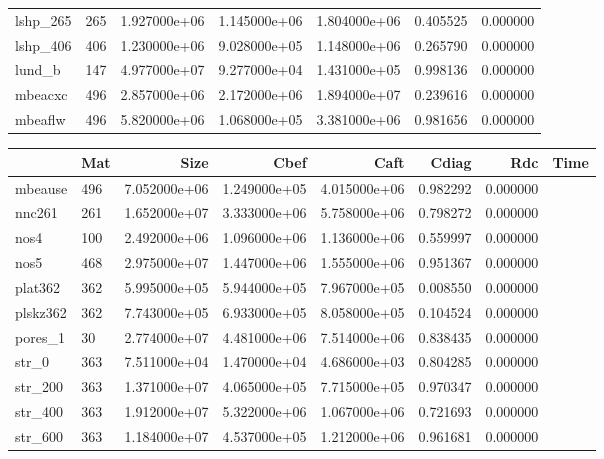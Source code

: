 \begin{tabular}{lrrrrrr}
lshp\_265                &  265 &  1.927000e+06 &  1.145000e+06 &  1.804000e+06 &  0.405525 &  0.000000 \\
lshp\_406                &  406 &  1.230000e+06 &  9.028000e+05 &  1.148000e+06 &  0.265790 &  0.000000 \\
lund\_b                  &  147 &  4.977000e+07 &  9.277000e+04 &  1.431000e+05 &  0.998136 &  0.000000 \\
mbeacxc                 &  496 &  2.857000e+06 &  2.172000e+06 &  1.894000e+07 &  0.239616 &  0.000000 \\
mbeaflw                 &  496 &  5.820000e+06 &  1.068000e+05 &  3.381000e+06 &  0.981656 &  0.000000 \\
\bottomrule
\end{tabular}
\begin{tabular}{llrrrrrr}
\toprule
{} &                      Mat &  Size &          Cbef &          Caft &         Cdiag &       Rdc &  Time \\
\midrule
mbeause                 &  496 &  7.052000e+06 &  1.249000e+05 &  4.015000e+06 &  0.982292 &  0.000000 \\
nnc261                  &  261 &  1.652000e+07 &  3.333000e+06 &  5.758000e+06 &  0.798272 &  0.000000 \\
nos4                    &  100 &  2.492000e+06 &  1.096000e+06 &  1.136000e+06 &  0.559997 &  0.000000 \\
nos5                    &  468 &  2.975000e+07 &  1.447000e+06 &  1.555000e+06 &  0.951367 &  0.000000 \\
plat362                 &  362 &  5.995000e+05 &  5.944000e+05 &  7.967000e+05 &  0.008550 &  0.000000 \\
plskz362                &  362 &  7.743000e+05 &  6.933000e+05 &  8.058000e+05 &  0.104524 &  0.000000 \\
pores\_1                 &   30 &  2.774000e+07 &  4.481000e+06 &  7.514000e+06 &  0.838435 &  0.000000 \\
str\_0                   &  363 &  7.511000e+04 &  1.470000e+04 &  4.686000e+03 &  0.804285 &  0.000000 \\
str\_200                 &  363 &  1.371000e+07 &  4.065000e+05 &  7.715000e+05 &  0.970347 &  0.000000 \\
str\_400                 &  363 &  1.912000e+07 &  5.322000e+06 &  1.067000e+06 &  0.721693 &  0.000000 \\
str\_600                 &  363 &  1.184000e+07 &  4.537000e+05 &  1.212000e+06 &  0.961681 &  0.000000 \\

\end{tabular}

